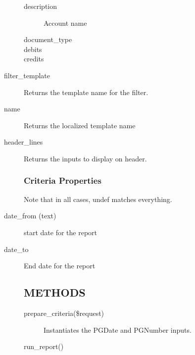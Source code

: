 \begin{description}
\begin{description}
\begin{description}
\item[{description}] \mbox{}

Account name


\item[{document\_type}] \mbox{}
\item[{debits}] \mbox{}
\item[{credits}] \mbox{}\end{description}

\item[{filter\_template}] \mbox{}

Returns the template name for the filter.


\item[{name}] \mbox{}

Returns the localized template name


\item[{header\_lines}] \mbox{}

Returns the inputs to display on header.

\subsubsection*{Criteria Properties\label{LedgerSMB::DBObject::Report::co::Balance_y_Mayor_Criteria_Properties}}


Note that in all cases, undef matches everything.


\item[{date\_from (text)}] \mbox{}

start date for the report


\item[{date\_to}] \mbox{}

End date for the report

\subsection*{METHODS\label{LedgerSMB::DBObject::Report::co::Balance_y_Mayor_METHODS}}
\begin{description}

\item[{prepare\_criteria(\$request)}] \mbox{}

Instantiates the PGDate and PGNumber inputs.


\item[{run\_report()}] \mbox{}


\end{description}
\end{description}
\end{description}
